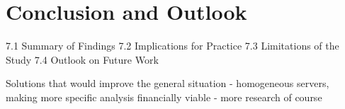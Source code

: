 \chapter{Conclusion and Outlook} %
\label{Chapter7}

    7.1 Summary of Findings
    7.2 Implications for Practice
    7.3 Limitations of the Study
    7.4 Outlook on Future Work


Solutions that would improve the general situation
- homogeneous servers, making more specific analysis financially viable
- more research of course
